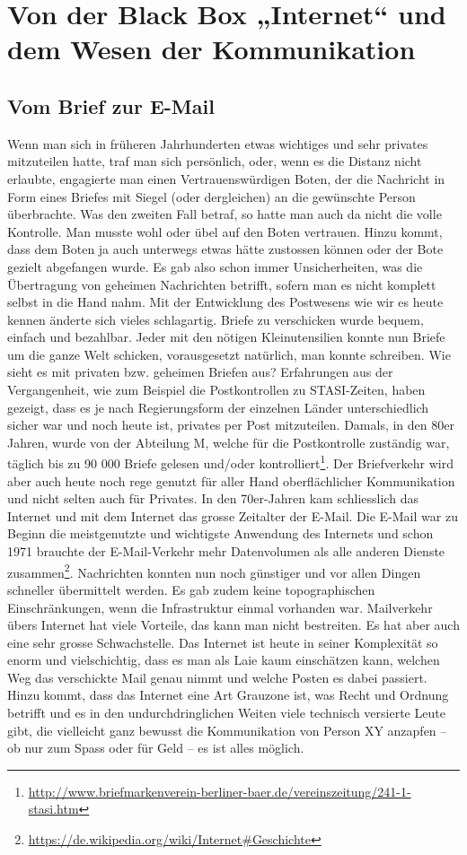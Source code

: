 \section{Von der Black Box „Internet“ und dem Wesen der Kommunikation}
\subsection{Vom Brief zur E-Mail}
Wenn man sich in früheren Jahrhunderten etwas wichtiges und sehr privates mitzuteilen hatte, traf man sich persönlich, oder, wenn es die Distanz nicht erlaubte, engagierte man einen Vertrauenswürdigen Boten, der die Nachricht in Form eines Briefes mit Siegel (oder dergleichen) an die gewünschte Person überbrachte. Was den zweiten Fall betraf, so hatte man auch da nicht die volle Kontrolle. Man musste wohl oder übel auf den Boten vertrauen. Hinzu kommt, dass dem Boten ja auch unterwegs etwas hätte zustossen können oder der Bote gezielt abgefangen wurde. Es gab also schon immer Unsicherheiten, was die Übertragung von geheimen Nachrichten betrifft, sofern man es nicht komplett selbst in die Hand nahm. Mit der Entwicklung des Postwesens wie wir es heute kennen änderte sich vieles schlagartig. Briefe zu verschicken wurde bequem, einfach und bezahlbar. Jeder mit den nötigen Kleinutensilien konnte nun Briefe um die ganze Welt schicken, vorausgesetzt natürlich, man konnte schreiben. Wie sieht es mit privaten bzw. geheimen Briefen aus? Erfahrungen aus der Vergangenheit, wie zum Beispiel die Postkontrollen zu STASI-Zeiten, haben gezeigt, dass es je nach Regierungsform der einzelnen Länder unterschiedlich sicher war und noch heute ist, privates per Post mitzuteilen. Damals, in den 80er Jahren, wurde von der Abteilung M, welche für die Postkontrolle zuständig war, täglich bis zu 90 000 Briefe gelesen und/oder kontrolliert\footnote{\url{http://www.briefmarkenverein-berliner-baer.de/vereinszeitung/241-1-stasi.htm}}. Der Briefverkehr wird aber auch heute noch rege genutzt für aller Hand oberflächlicher Kommunikation und nicht selten auch für Privates. In den 70er-Jahren kam schliesslich das Internet und mit dem Internet das grosse Zeitalter der E-Mail. Die E-Mail war zu Beginn die meistgenutzte und wichtigste Anwendung des Internets und schon 1971 brauchte der E-Mail-Verkehr mehr Datenvolumen als alle anderen Dienste zusammen\footnote{\url{https://de.wikipedia.org/wiki/Internet\#Geschichte}}. Nachrichten konnten nun noch günstiger und vor allen Dingen schneller übermittelt werden. Es gab zudem keine topographischen Einschränkungen, wenn die Infrastruktur einmal vorhanden war. Mailverkehr übers Internet hat viele Vorteile, das kann man nicht bestreiten. Es hat aber auch eine sehr grosse Schwachstelle. Das Internet ist heute in seiner Komplexität so enorm und vielschichtig, dass es man als Laie kaum einschätzen kann, welchen Weg das verschickte Mail genau nimmt und welche Posten es dabei passiert. Hinzu kommt, dass das Internet eine Art Grauzone ist, was Recht und Ordnung betrifft und es in den undurchdringlichen Weiten viele technisch versierte Leute gibt, die vielleicht ganz bewusst die Kommunikation von Person XY anzapfen – ob nur zum Spass oder für Geld – es ist alles möglich.

